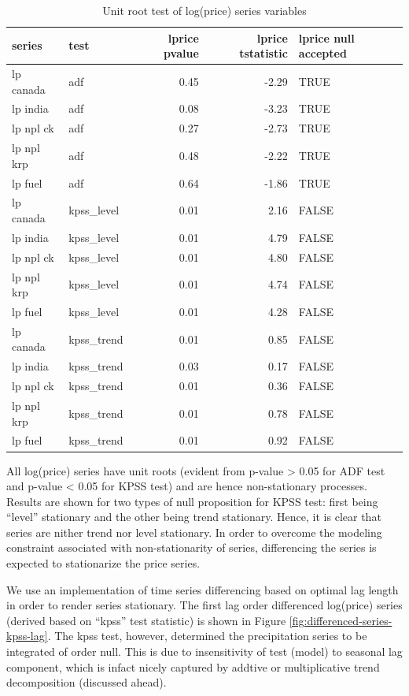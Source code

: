 \documentclass[12pt,]{article}
\begin{document}
\begin{table}

\caption{\label{tab:adf-kpss-test-retail}Unit root test of log(price) series variables}
\centering
\begin{tabular}[t]{>{\raggedright\arraybackslash}p{8em}lrrl}
\toprule
series & test & lprice pvalue & lprice tstatistic & lprice null accepted\\
\midrule
lp canada & adf & 0.45 & -2.29 & TRUE\\
lp india & adf & 0.08 & -3.23 & TRUE\\
lp npl ck & adf & 0.27 & -2.73 & TRUE\\
lp npl krp & adf & 0.48 & -2.22 & TRUE\\
lp fuel & adf & 0.64 & -1.86 & TRUE\\
\addlinespace
lp canada & kpss\_level & 0.01 & 2.16 & FALSE\\
lp india & kpss\_level & 0.01 & 4.79 & FALSE\\
lp npl ck & kpss\_level & 0.01 & 4.80 & FALSE\\
lp npl krp & kpss\_level & 0.01 & 4.74 & FALSE\\
lp fuel & kpss\_level & 0.01 & 4.28 & FALSE\\
\addlinespace
lp canada & kpss\_trend & 0.01 & 0.85 & FALSE\\
lp india & kpss\_trend & 0.03 & 0.17 & FALSE\\
lp npl ck & kpss\_trend & 0.01 & 0.36 & FALSE\\
lp npl krp & kpss\_trend & 0.01 & 0.78 & FALSE\\
lp fuel & kpss\_trend & 0.01 & 0.92 & FALSE\\
\bottomrule
\end{tabular}
\end{table}

All log(price) series have unit roots (evident from p-value \textgreater{} 0.05 for ADF test and p-value \textless{} 0.05 for KPSS test) and are hence non-stationary processes. Results are shown for two types of null proposition for KPSS test: first being ``level'' stationary and the other being trend stationary. Hence, it is clear that series are nither trend nor level stationary. In order to overcome the modeling constraint associated with non-stationarity of series, differencing the series is expected to stationarize the price series.

We use an implementation of time series differencing based on optimal lag length in order to render series stationary. The first lag order differenced log(price) series (derived based on ``kpss'' test statistic) is shown in Figure \ref{fig:differenced-series-kpss-lag}. The kpss test, however, determined the precipitation series to be integrated of order null. This is due to insensitivity of test (model) to seasonal lag component, which is infact nicely captured by addtive or multiplicative trend decomposition (discussed ahead).
\end{document}
